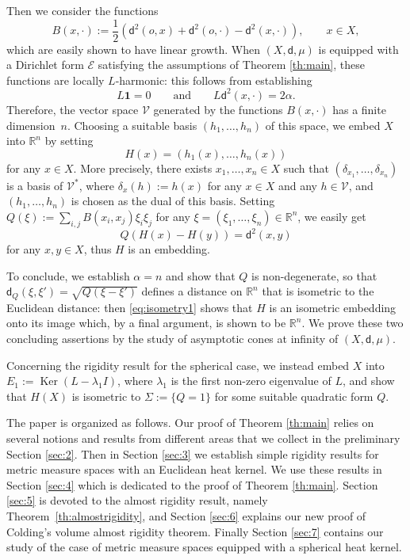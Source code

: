 \documentclass[10pt]{amsart}
\DeclareMathOperator{\Ker}{Ker}
\theoremstyle{plain}
\theoremstyle{definition}
\newcommand{\setR}{\mathbb{R}}
\newcommand{\cE}{\mathcal{E}}
\newcommand{\cV}{\mathcal{V}}
\newcommand{\dist}{\mathsf{d}}
\begin{document}
Then we consider the functions
\[
B(x,\cdot):=\frac{1}{2}(\dist^2(o,x)+\dist^2(o,\cdot)-\dist^2(x,\cdot)), \qquad x \in X,
\]
which are easily shown to have linear growth. When $(X,\dist,\mu)$ is equipped with a Dirichlet form $\cE$ satisfying the assumptions of Theorem \ref{th:main}, these functions are locally $L$-harmonic: this follows from establishing
\[
L\textbf{1}=0 \qquad \text{and} \qquad L\dist^2(x,\cdot) = 2 \alpha.
\]
Therefore, the vector space $\cV$ generated by the functions $B(x,\cdot)$ has a finite dimension~$n$. Choosing a suitable basis $(h_1,\ldots,h_n)$ of this space, we embed $X$ into $\setR^n$ by setting
\[
H(x)=(h_1(x),\ldots,h_n(x))
\]
for any $x \in X$. More precisely, there exists $x_1,\ldots,x_n \in X$ such that $(\delta_{x_1},\ldots,\delta_{x_n})$ is a basis of $\cV^{*}$, where $\delta_{x}(h):=h(x)$ for any $x \in X$ and any $h \in \cV$, and $(h_1,\ldots,h_n)$ is chosen as the dual of this basis. Setting $Q(\xi):= \sum_{i,j} B(x_i,x_j)\xi_i \xi_j$ for any $\xi=(\xi_1,\dots,\xi_n) \in \setR^n$, we easily get
\begin{equation}\label{eq:isometry1}
Q(H(x)-H(y))=\dist^2(x,y)
\end{equation}
for any $x, y \in X$, thus $H$ is an embedding.

To conclude, we establish $\alpha = n$ and show that $Q$ is non-degenerate, so that $\dist_Q(\xi,\xi')=\sqrt{Q(\xi-\xi')}$ defines a distance on $\setR^n$ that is isometric to the Euclidean distance: then \eqref{eq:isometry1} shows that $H$ is an isometric embedding onto its image which, by a final argument, is shown to be $\setR^n$. We prove these two concluding assertions by the study of asymptotic cones at infinity of $(X,\dist,\mu)$.

Concerning the rigidity result for the spherical case, we instead embed $X$ into $E_1:=\Ker(L-\lambda_1 I)$, where $\lambda_1$ is the first non-zero eigenvalue of $L$, and show that $H(X)$ is isometric to $\Sigma:=\{Q=1\}$ for some suitable quadratic form $Q$.

The paper is organized as follows. Our proof of Theorem \ref{th:main} relies on several notions and results from different areas that we collect in the preliminary Section \ref{sec:2}. Then in Section \ref{sec:3} we establish simple rigidity results for metric measure spaces with an Euclidean heat kernel. We use these results in Section \ref{sec:4} which is dedicated to the proof of Theorem \ref{th:main}. Section \ref{sec:5} is devoted to the almost rigidity result, namely Theorem~\ref{th:almostrigidity}, and Section \ref{sec:6} explains our new proof of Colding's volume almost rigidity theorem. Finally Section \ref{sec:7} contains our study of the case of metric measure spaces equipped with a spherical heat kernel.
\end{document}
